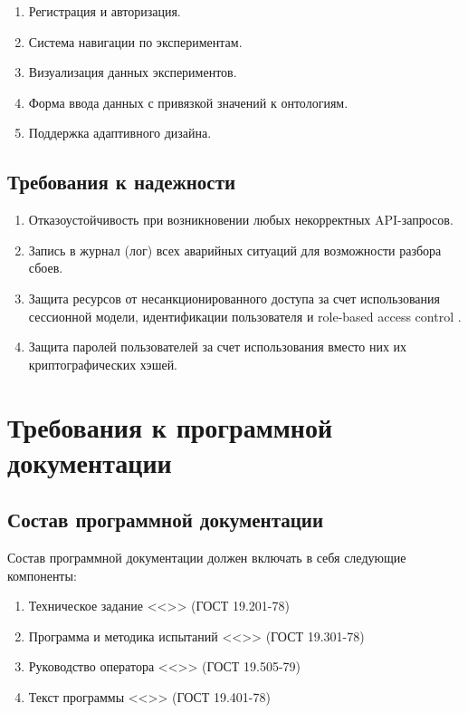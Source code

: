 \documentclass[a4paper,12pt,reqno]{article}
\begin{document}
    \begin{enumerate}
        \item Регистрация и авторизация.
        \item Система навигации по экспериментам.
        \item Визуализация данных экспериментов.
        \item Форма ввода данных с привязкой значений к онтологиям.
        \item Поддержка адаптивного дизайна.
    \end{enumerate}

    \subsection{Требования к надежности}

    \begin{enumerate}
        \item Отказоустойчивость при возникновении любых некорректных API-запросов.
        \item Запись в журнал (лог) всех аварийных ситуаций для возможности разбора сбоев.
        \item Защита ресурсов от несанкционированного доступа за счет использования сессионной модели, идентификации пользователя и role-based access control \cite{arch:RBAC}.
        \item Защита паролей пользователей за счет использования вместо них их криптографических хэшей.
    \end{enumerate}

    \section{Требования к программной документации}

    \subsection{Состав программной документации}
    Состав программной документации должен включать в себя следующие компоненты:
    \begin{enumerate}
        \item Техническое задание <<\unskip>> (ГОСТ 19.201-78) \label{tz}
        \item Программа и методика испытаний <<\unskip>> (ГОСТ 19.301-78) \label{pmi}
        \item Руководство оператора <<\unskip>> (ГОСТ 19.505-79) \label{ro}
        \item Текст программы <<\unskip>> (ГОСТ 19.401-78) \label{tp}
    \end{enumerate}
\end{document}
